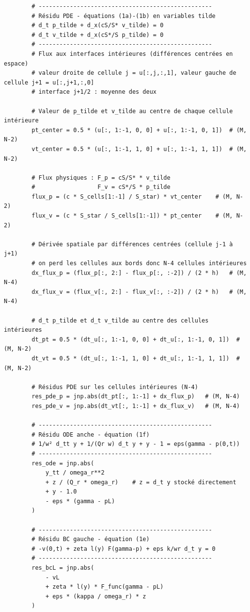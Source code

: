 \documentclass[12pt,a4paper]{article}
\begin{document}
\begin{verbatim}
        # --------------------------------------------------
        # Résidu PDE - équations (1a)-(1b) en variables tilde
        # d_t p_tilde + d_x(cS/S* v_tilde) = 0
        # d_t v_tilde + d_x(cS*/S p_tilde) = 0
        # --------------------------------------------------
        # Flux aux interfaces intérieures (différences centrées en espace)
        # valeur droite de cellule j = u[:,j,:,1], valeur gauche de cellule j+1 = u[:,j+1,:,0]
        # interface j+1/2 : moyenne des deux

        # Valeur de p_tilde et v_tilde au centre de chaque cellule intérieure
        pt_center = 0.5 * (u[:, 1:-1, 0, 0] + u[:, 1:-1, 0, 1])  # (M, N-2)
        vt_center = 0.5 * (u[:, 1:-1, 1, 0] + u[:, 1:-1, 1, 1])  # (M, N-2)

        # Flux physiques : F_p = cS/S* * v_tilde 
        #                  F_v = cS*/S * p_tilde 
        flux_p = (c * S_cells[1:-1] / S_star) * vt_center    # (M, N-2)
        flux_v = (c * S_star / S_cells[1:-1]) * pt_center    # (M, N-2)

        # Dérivée spatiale par différences centrées (cellule j-1 à j+1)
        # on perd les cellules aux bords donc N-4 cellules intérieures
        dx_flux_p = (flux_p[:, 2:] - flux_p[:, :-2]) / (2 * h)   # (M, N-4)
        dx_flux_v = (flux_v[:, 2:] - flux_v[:, :-2]) / (2 * h)   # (M, N-4)

        # d_t p_tilde et d_t v_tilde au centre des cellules intérieures
        dt_pt = 0.5 * (dt_u[:, 1:-1, 0, 0] + dt_u[:, 1:-1, 0, 1])  # (M, N-2)
        dt_vt = 0.5 * (dt_u[:, 1:-1, 1, 0] + dt_u[:, 1:-1, 1, 1])  # (M, N-2)

        # Résidus PDE sur les cellules intérieures (N-4)
        res_pde_p = jnp.abs(dt_pt[:, 1:-1] + dx_flux_p)   # (M, N-4)
        res_pde_v = jnp.abs(dt_vt[:, 1:-1] + dx_flux_v)   # (M, N-4)

        # --------------------------------------------------
        # Résidu ODE anche - équation (1f)
        # 1/w² d_tt y + 1/(Qr w) d_t y + y - 1 = eps(gamma - p(0,t))
        # --------------------------------------------------
        res_ode = jnp.abs(
            y_tt / omega_r**2
            + z / (Q_r * omega_r)    # z = d_t y stocké directement 
            + y - 1.0
            - eps * (gamma - pL)
        )

        # --------------------------------------------------
        # Résidu BC gauche - équation (1e)
        # -v(0,t) + zeta l(y) F(gamma-p) + eps k/wr d_t y = 0
        # --------------------------------------------------
        res_bcL = jnp.abs(
            - vL
            + zeta * l(y) * F_func(gamma - pL)
            + eps * (kappa / omega_r) * z
        )


\end{verbatim}
\end{document}

